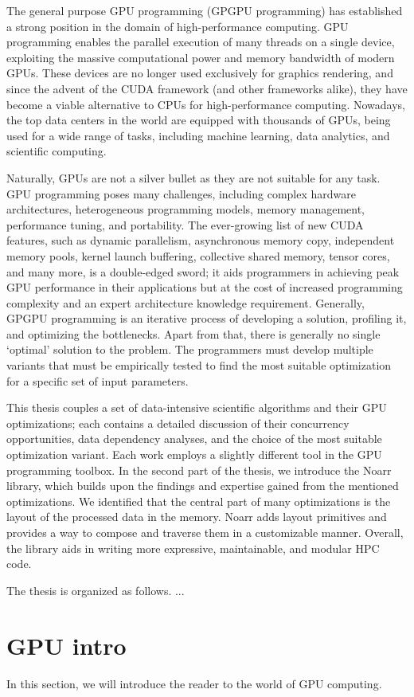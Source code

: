 
The general purpose GPU programming (GPGPU programming) has established a strong position in the domain of high-performance computing. 
GPU programming enables the parallel execution of many threads on a single device, exploiting the massive computational power and memory bandwidth of modern GPUs. 
These devices are no longer used exclusively for graphics rendering, and since the advent of the CUDA framework (and other frameworks alike), they have become a viable alternative to CPUs for high-performance computing.
Nowadays, the top data centers in the world are equipped with thousands of GPUs, being used for a wide range of tasks, including machine learning, data analytics, and scientific computing.

Naturally, GPUs are not a silver bullet as they are not suitable for any task. 
GPU programming poses many challenges, including complex hardware architectures, heterogeneous programming models, memory management, performance tuning, and portability.
The ever-growing list of new CUDA features, such as dynamic parallelism, asynchronous memory copy, independent memory pools, kernel launch buffering, collective shared memory, tensor cores, and many more, is a double-edged sword; 
it aids programmers in achieving peak GPU performance in their applications but at the cost of increased programming complexity and an expert architecture knowledge requirement.
Generally, GPGPU programming is an iterative process of developing a solution, profiling it, and optimizing the bottlenecks.
Apart from that, there is generally no single `optimal' solution to the problem. The programmers must develop multiple variants that must be empirically tested to find the most suitable optimization for a specific set of input parameters.

This thesis couples a set of data-intensive scientific algorithms and their GPU optimizations; each contains a detailed discussion of their concurrency opportunities, data dependency analyses, and the choice of the most suitable optimization variant. Each work employs a slightly different tool in the GPU programming toolbox. 
In the second part of the thesis, we introduce the Noarr library, which builds upon the findings and expertise gained from the mentioned optimizations. We identified that the central part of many optimizations is the layout of the processed data in the memory. 
Noarr adds layout primitives and provides a way to compose and traverse them in a customizable manner. Overall, the library aids in writing more expressive, maintainable, and modular HPC code.

The thesis is organized as follows. ...

\section*{GPU intro}

In this section, we will introduce the reader to the world of GPU computing.
